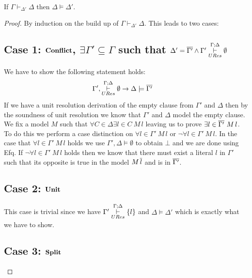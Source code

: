 \begin{mytheorem}\label{thm:Incompatibility}
If $\Gamma \vdash_{\Delta'} \Delta$  then  $\Delta \models \Delta'$.
%
\begin{proof}
By induction on the build up of $\Gamma \vdash_{\Delta'} \Delta$. This leads to two  cases:
\subsection*{Case 1: $\mathbf{Conflict}$, $\exists \Gamma' \subseteq \Gamma$ such that $\Delta' = \overline{\Gamma'} \wedge \Gamma' \overset{\Gamma;\Delta}{\underset{URes}{\vdash}}\emptyset$}
We have to show the following statement holds:
%
\begin{align*}
\Gamma'&, \overset{\Gamma;\Delta}{\underset{URes}{\vdash}} \emptyset\to \Delta \models \overline{\Gamma'}
\end{align*}
%
%
If we have a unit resolution derivation of the empty clause from $\Gamma'$ and $\Delta$ then by the soundness of unit resolution we know  that $\Gamma'$ and $\Delta$ model the empty clause.  We fix a model $M$ such that $\forall C \in \Delta \exists l \in C \ M \, l$  leaving us to prove $\exists l \in \overline{\Gamma'} \ M \, l$. To do this we perform a case distinction on $\forall l \in \Gamma' \ M \, l$ or $\neg \forall l \in \Gamma' \ M \, l$. In the case that $\forall l \in \Gamma' \ M \, l$ holds we use $\Gamma', \Delta \models \emptyset$ to obtain $\bot$ and we are done using Efq. If $\neg \forall l \in \Gamma' \ M \, l$ holds then we know that there must exist a literal $l$ in $\Gamma'$ such that its opposite is true in the model $M \, \overline{l}$ and is in $\overline{\Gamma'}$.
%

\subsection*{Case 2: $\mathbf{Unit}$}
This case is trivial since we have $\Gamma'\overset{\Gamma;\Delta}{\underset{URes}{\vdash}} \{l \}$ and $\Delta \models \Delta'$ which is exactly what we have to show.
\subsection*{Case 3: $\mathbf{Split}$}



\end{proof}
\end{mytheorem}
